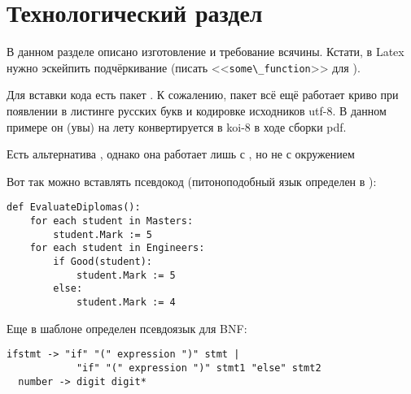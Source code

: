 \chapter{Технологический раздел}
\label{cha:impl}

В данном разделе описано изготовление и требование всячины. Кстати,
в Latex нужно эскейпить подчёркивание (писать <<\verb|some\_function|>> для ).

\ifPDFTeX
Для вставки кода есть пакет . К сожалению, пакет  всё ещё
работает криво при появлении в листинге русских букв и кодировке исходников utf-8.
В данном примере он (увы) на лету конвертируется в koi-8 в ходе сборки pdf.

Есть альтернатива , однако она работает лишь с
, но не с окружением 

Вот так можно вставлять псевдокод (питоноподобный язык определен в ):

\begin{lstlisting}[style=pseudocode,caption={Алгоритм оценки дипломных работ}]
def EvaluateDiplomas():
    for each student in Masters:
        student.Mark := 5
    for each student in Engineers:
        if Good(student):
            student.Mark := 5
        else:
            student.Mark := 4
\end{lstlisting}

Еще в шаблоне определен псевдоязык для BNF:

\begin{lstlisting}[style=grammar,basicstyle=\small,caption={Грамматика}]
  ifstmt -> "if" "(" expression ")" stmt |
            "if" "(" expression ")" stmt1 "else" stmt2
  number -> digit digit*
\end{lstlisting}



%


